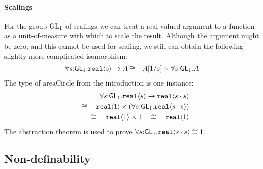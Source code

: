 \paragraph{Scalings}
For the group $\mathrm{GL}_1$ of scalings we can treat
a real-valued argument to a function as a unit-of-measure with
which to scale the result. 
Although the argument might be zero, and this cannot be used for scaling,
we still can obtain the following slightly more complicated
isomorphism:
\begin{eqnarray*}
\forall s\mathord:\mathsf{GL}_1.\textup{\texttt{real}}\langle s \rangle\to A
& \cong &
A[1/s]\times \forall s\mathord:\mathsf{GL}_1.A
\end{eqnarray*}
The type of $\mathrm{areaCircle}$ from the introduction is one instance:
\begin{eqnarray*}
\forall s\mathord:\mathsf{GL}_1.\textup{\texttt{real}}\langle s \rangle\to\textup{\texttt{real}}\langle s\cdot
  s \rangle\\ \quad\cong\quad \textup{\texttt{real}}\langle 1 \rangle\times(\forall
s\mathord:\mathsf{GL}_1.\textup{\texttt{real}}\langle s\cdot s \rangle)\\ \quad\cong\quad
\textup{\texttt{real}}\langle 1 \rangle\times 1\quad\cong\quad \textup{\texttt{real}}\langle 1 \rangle
\end{eqnarray*}
The abstraction theorem is used to prove
$\forall s\mathord:\mathsf{GL}_1.\textup{\texttt{real}}\langle s\cdot s \rangle\cong 1$.


\subsection{Non-definability}
\label{sec:types-indexed-abelian-groups-indef}

\newcommand{\Grp}{\mathit{Gr}}

